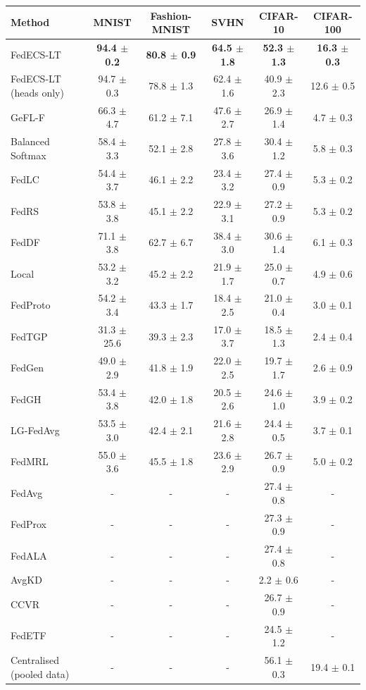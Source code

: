 \begin{tabular}{lccccc}
\toprule
Method & MNIST & Fashion-MNIST & SVHN & CIFAR-10 & CIFAR-100\\
\midrule
FedECS-LT & \textbf{94.4 $\pm$ 0.2} & \textbf{80.8 $\pm$ 0.9} & \textbf{64.5 $\pm$ 1.8} & \textbf{52.3 $\pm$ 1.3} & \textbf{16.3 $\pm$ 0.3}\\
FedECS-LT (heads only) & 94.7 $\pm$ 0.3 & 78.8 $\pm$ 1.3 & 62.4 $\pm$ 1.6 & 40.9 $\pm$ 2.3 & 12.6 $\pm$ 0.5\\
GeFL-F & 66.3 $\pm$ 4.7 & 61.2 $\pm$ 7.1 & 47.6 $\pm$ 2.7 & 26.9 $\pm$ 1.4 & 4.7 $\pm$ 0.3\\
Balanced Softmax & 58.4 $\pm$ 3.3 & 52.1 $\pm$ 2.8 & 27.8 $\pm$ 3.6 & 30.4 $\pm$ 1.2 & 5.8 $\pm$ 0.3\\
FedLC & 54.4 $\pm$ 3.7 & 46.1 $\pm$ 2.2 & 23.4 $\pm$ 3.2 & 27.4 $\pm$ 0.9 & 5.3 $\pm$ 0.2\\
FedRS & 53.8 $\pm$ 3.8 & 45.1 $\pm$ 2.2 & 22.9 $\pm$ 3.1 & 27.2 $\pm$ 0.9 & 5.3 $\pm$ 0.2\\
FedDF & 71.1 $\pm$ 3.8 & 62.7 $\pm$ 6.7 & 38.4 $\pm$ 3.0 & 30.6 $\pm$ 1.4 & 6.1 $\pm$ 0.3\\
Local & 53.2 $\pm$ 3.2 & 45.2 $\pm$ 2.2 & 21.9 $\pm$ 1.7 & 25.0 $\pm$ 0.7 & 4.9 $\pm$ 0.6\\
FedProto & 54.2 $\pm$ 3.4 & 43.3 $\pm$ 1.7 & 18.4 $\pm$ 2.5 & 21.0 $\pm$ 0.4 & 3.0 $\pm$ 0.1\\
FedTGP & 31.3 $\pm$ 25.6 & 39.3 $\pm$ 2.3 & 17.0 $\pm$ 3.7 & 18.5 $\pm$ 1.3 & 2.4 $\pm$ 0.4\\
FedGen & 49.0 $\pm$ 2.9 & 41.8 $\pm$ 1.9 & 22.0 $\pm$ 2.5 & 19.7 $\pm$ 1.7 & 2.6 $\pm$ 0.9\\
FedGH & 53.4 $\pm$ 3.8 & 42.0 $\pm$ 1.8 & 20.5 $\pm$ 2.6 & 24.6 $\pm$ 1.0 & 3.9 $\pm$ 0.2\\
LG-FedAvg & 53.5 $\pm$ 3.0 & 42.4 $\pm$ 2.1 & 21.6 $\pm$ 2.8 & 24.4 $\pm$ 0.5 & 3.7 $\pm$ 0.1\\
FedMRL & 55.0 $\pm$ 3.6 & 45.5 $\pm$ 1.8 & 23.6 $\pm$ 2.9 & 26.7 $\pm$ 0.9 & 5.0 $\pm$ 0.2\\
FedAvg & - & - & - & 27.4 $\pm$ 0.8 & -\\
FedProx & - & - & - & 27.3 $\pm$ 0.9 & -\\
FedALA & - & - & - & 27.4 $\pm$ 0.8 & -\\
AvgKD & - & - & - & 2.2 $\pm$ 0.6 & -\\
CCVR & - & - & - & 26.7 $\pm$ 0.9 & -\\
FedETF & - & - & - & 24.5 $\pm$ 1.2 & -\\
Centralised (pooled data) & - & - & - & 56.1 $\pm$ 0.3 & 19.4 $\pm$ 0.1\\
\bottomrule
\end{tabular}

